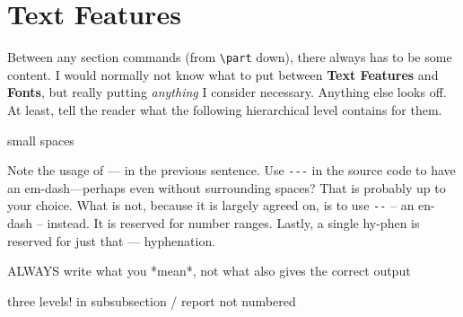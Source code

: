 \section{Text Features}
Between any section commands (from \verb|\part| down), there always has to be some content.
I would normally not know what to put between \textbf{Text Features} and \textbf{Fonts}, but really putting \textit{anything} I consider necessary.
Anything else looks off.
At least, tell the reader what the following hierarchical level contains for them.

small spaces \ 

Note the usage of --- in the previous sentence.
Use \verb|---| in the source code to have an em-dash---perhaps even without surrounding spaces?
That is probably up to your choice.
What is not, because it is largely agreed on, is to use \verb|--| -- an en-dash -- instead.
It is reserved for number ranges.
Lastly, a single hy-phen is reserved for just that --- hyphenation.

ALWAYS write what you *mean*, not what also gives the correct output


three levels! in subsubsection / report not numbered